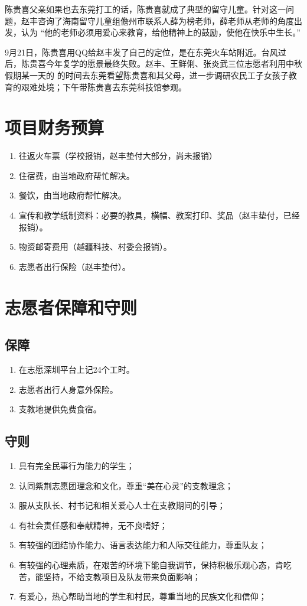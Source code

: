 \documentclass[12pt]{ctexart}
\begin{document}
\begin{appendix}
陈贵喜父亲如果也去东莞打工的话，陈贵喜就成了典型的留守儿童。针对这一问题，赵丰咨询了海南留守儿童组儋州市联系人薛为榜老师，薛老师从老师的角度出发，认为
“他的老师必须用爱心来教育，给他精神上的鼓励，使他在快乐中生长。”

9月21日，陈贵喜用QQ给赵丰发了自己的定位，是在东莞火车站附近。台风过后，陈贵喜今年复学的愿景最终失败。赵丰、王鲜俐、张炎武三位志愿者利用中秋假期某一天的
的时间去东莞看望陈贵喜和其父母，进一步调研农民工子女孩子教育的艰难处境；下午带陈贵喜去东莞科技馆参观。
\section{项目财务预算}\label{scheduling}
\begin{enumerate}
\item 往返火车票（学校报销，赵丰垫付大部分，尚未报销）
\item 住宿费，由当地政府帮忙解决。
\item 餐饮，由当地政府帮忙解决。
\item 宣传和教学纸制资料：必要的教具，横幅、教案打印、奖品（赵丰垫付，已经报销）。
\item 物资邮寄费用（越疆科技、村委会报销）。
\item 志愿者出行保险（赵丰垫付）。
\end{enumerate}
\section{志愿者保障和守则}
\subsection{保障}
\begin{enumerate}
\item 在志愿深圳平台上记24个工时。
\item 志愿者出行人身意外保险。
\item 支教地提供免费食宿。
\end{enumerate}
\subsection{守则}
\begin{enumerate}[label = {(\chinese*)}]
\item 具有完全民事行为能力的学生；
\item 认同紫荆志愿团理念和文化，尊重“美在心灵”的支教理念；
\item 服从支队长、村书记和相关爱心人士在支教期间的引导；
\item 有社会责任感和奉献精神，无不良嗜好；
\item 有较强的团结协作能力、语言表达能力和人际交往能力，尊重队友；
\item 有较强的心理素质，在艰苦的环境下能自我调节，保持积极乐观心态，肯吃苦，能坚持，不给支教项目及队友带来负面影响； 
\item 有爱心，热心帮助当地的学生和村民，尊重当地的民族文化和信仰；
\end{enumerate}
\end{appendix}
\end{document}
